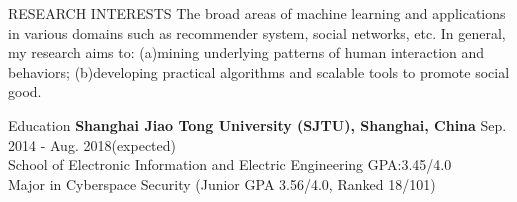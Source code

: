 \documentclass{resume} %
\begin{document}
\vspace{-1em}
\begin{rSection}{RESEARCH INTERESTS}
The broad areas of machine learning and applications in various domains such as recommender system, social networks, etc. In general, my research aims to: (a)mining underlying patterns of human interaction and behaviors; (b)developing practical algorithms and scalable tools to promote social good.
\end{rSection}


\begin{rSection}{Education}
\textbf{Shanghai Jiao Tong University (SJTU), Shanghai, China} \hfill Sep. 2014 - Aug. 2018(expected)\\ %
School of Electronic Information and Electric Engineering  \hfill GPA:3.45/4.0 \\
Major in Cyberspace Security \hfill (Junior GPA 3.56/4.0, Ranked 18/101)
\end{rSection}
\end{document}
